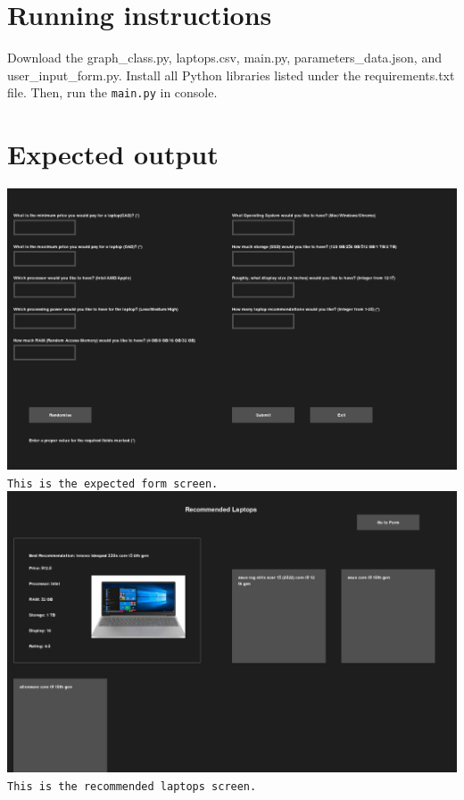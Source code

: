 \documentclass{article}
\begin{document}
\section{Running instructions}
Download the graph\_class.py, laptops.csv, main.py, parameters\_data.json, and user\_input\_form.py.
Install all Python libraries listed under the requirements.txt file.
Then, run the \texttt{main.py} in console.

\section{Expected output}
\includegraphics[scale=0.1]{proj2_input_form.png}
\\
\texttt{This is the expected form screen.}
\\
\includegraphics[scale=0.1]{proj2_output_window.png}
\\
\texttt{This is the recommended laptops screen.}
\end{document}
